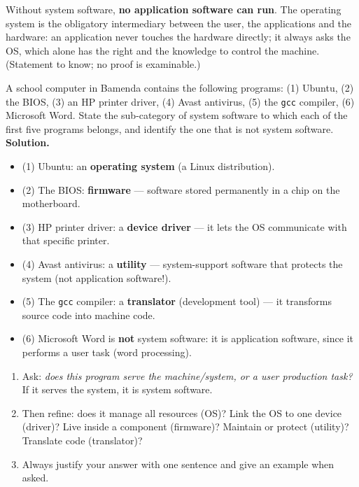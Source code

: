 \documentclass[11pt]{article}
\begin{document}
\begin{propriete}
Without system software, \textbf{no application software can run}. The operating system is the obligatory intermediary between the user, the applications and the hardware: an application never touches the hardware directly; it always asks the OS, which alone has the right and the knowledge to control the machine. (Statement to know; no proof is examinable.)
\end{propriete}

\begin{exoresolu}
A school computer in Bamenda contains the following programs: (1) Ubuntu, (2) the BIOS, (3) an HP printer driver, (4) Avast antivirus, (5) the \texttt{gcc} compiler, (6) Microsoft Word. State the sub-category of system software to which each of the first five programs belongs, and identify the one that is not system software.
\tcblower
\textbf{Solution.}
\begin{itemize}
\item (1) Ubuntu: an \textbf{operating system} (a Linux distribution).
\item (2) The BIOS: \textbf{firmware} — software stored permanently in a chip on the motherboard.
\item (3) HP printer driver: a \textbf{device driver} — it lets the OS communicate with that specific printer.
\item (4) Avast antivirus: a \textbf{utility} — system-support software that protects the system (not application software!).
\item (5) The \texttt{gcc} compiler: a \textbf{translator} (development tool) — it transforms source code into machine code.
\item (6) Microsoft Word is \textbf{not} system software: it is application software, since it performs a user task (word processing).
\end{itemize}
\end{exoresolu}

\begin{methode}
\begin{enumerate}
\item Ask: \emph{does this program serve the machine/system, or a user production task?} If it serves the system, it is system software.
\item Then refine: does it manage all resources (OS)? Link the OS to one device (driver)? Live inside a component (firmware)? Maintain or protect (utility)? Translate code (translator)?
\item Always justify your answer with one sentence and give an example when asked.
\end{enumerate}
\end{methode}
\end{document}
